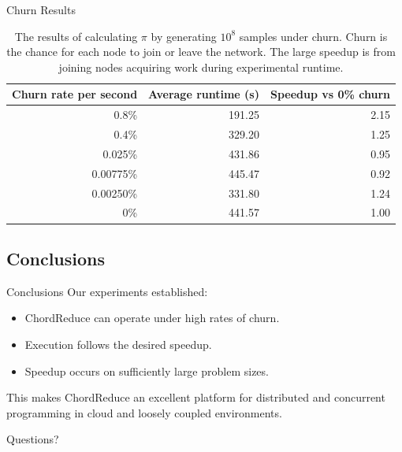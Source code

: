 \documentclass[11pt]{beamer}
\begin{document}
\begin{frame}{Churn Results}
\begin{table}
    \centering
    \begin{tabular}{|r|r|r|} 
        \hline 
        Churn rate per second & Average runtime (s) & Speedup vs 0\% churn\\ \hline{}
        0.8\% & 191.25 & 2.15 \\ \hline
        0.4\% & 329.20 & 1.25 \\ \hline
        0.025\% & 431.86 & 0.95 \\ \hline 
        0.00775\%  & 445.47 & 0.92 \\ \hline 
        0.00250\% & 331.80  &  1.24 \\ \hline 
        0\% & 441.57 & 1.00 \\ \hline
    \end{tabular}
    \caption{The results of calculating $\pi$ by generating $10^8$ samples under churn. Churn is the chance for each node to join or leave the network. The large speedup is from joining nodes acquiring work during experimental runtime.} 
    \label{churnSpeed}
\end{table}

\end{frame}




\subsection{Conclusions}

\begin{frame}{Conclusions}
Our experiments established:
\begin{itemize}
	\item ChordReduce can operate under high rates of churn.
	\item Execution follows the desired speedup.
	\item Speedup occurs on sufficiently large problem sizes.
\end{itemize}

This makes ChordReduce an excellent platform for distributed and concurrent programming in cloud and loosely coupled environments.

\end{frame}


\begin{frame}{}
Questions?
\end{frame}



\end{document}
